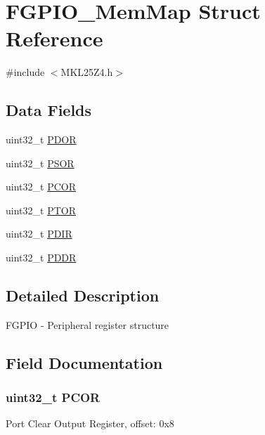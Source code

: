 \hypertarget{struct_f_g_p_i_o___mem_map}{}\section{F\+G\+P\+I\+O\+\_\+\+Mem\+Map Struct Reference}
\label{struct_f_g_p_i_o___mem_map}


{\ttfamily \#include $<$M\+K\+L25\+Z4.\+h$>$}

\subsection*{Data Fields}
\begin{DoxyCompactItemize}
\item 
uint32\+\_\+t \hyperlink{struct_f_g_p_i_o___mem_map_a6d8857d2ca1928bcedd1a83e93946aef}{P\+D\+O\+R}
\item 
uint32\+\_\+t \hyperlink{struct_f_g_p_i_o___mem_map_a2fc5ff57bdc9e1de4233930468cbf5e3}{P\+S\+O\+R}
\item 
uint32\+\_\+t \hyperlink{struct_f_g_p_i_o___mem_map_adba03f40e10aed5fc14d7ee0698aa6f2}{P\+C\+O\+R}
\item 
uint32\+\_\+t \hyperlink{struct_f_g_p_i_o___mem_map_a2a8b6ad3b774b37fcdf9a0f04f56e43b}{P\+T\+O\+R}
\item 
uint32\+\_\+t \hyperlink{struct_f_g_p_i_o___mem_map_a4c83a78320344c89b1663969a7c5d749}{P\+D\+I\+R}
\item 
uint32\+\_\+t \hyperlink{struct_f_g_p_i_o___mem_map_a37eee18eef001998403709bf78f4a33d}{P\+D\+D\+R}
\end{DoxyCompactItemize}


\subsection{Detailed Description}
F\+G\+P\+I\+O -\/ Peripheral register structure 

\subsection{Field Documentation}
\hypertarget{struct_f_g_p_i_o___mem_map_adba03f40e10aed5fc14d7ee0698aa6f2}{}
\subsubsection[{P\+C\+O\+R}]{\setlength{\rightskip}{0pt plus 5cm}uint32\+\_\+t P\+C\+O\+R}\label{struct_f_g_p_i_o___mem_map_adba03f40e10aed5fc14d7ee0698aa6f2}
Port Clear Output Register, offset\+: 0x8 \hypertarget{struct_f_g_p_i_o___mem_map_a37eee18eef001998403709bf78f4a33d}{}
